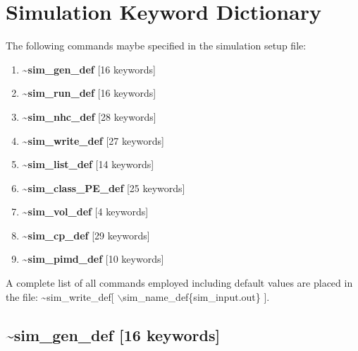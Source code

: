 \documentclass[12pt]{article}
\begin{document}
\newpage
\section*{\bf Simulation Keyword Dictionary} 

The following commands maybe specified in the simulation setup file:
\begin{enumerate}
\item {\bf \~{}sim\_gen\_def} [16 keywords]
\item {\bf \~{}sim\_run\_def} [16 keywords]
\item {\bf \~{}sim\_nhc\_def} [28 keywords]
\item {\bf \~{}sim\_write\_def} [27 keywords]
\item {\bf \~{}sim\_list\_def} [14 keywords]
\item {\bf \~{}sim\_class\_PE\_def} [25 keywords]
\item {\bf \~{}sim\_vol\_def} [4 keywords]
\item {\bf \~{}sim\_cp\_def} [29 keywords]
\item {\bf \~{}sim\_pimd\_def} [10 keywords]
\end{enumerate}
A complete list of all commands employed including default
values are placed in the file:
\~{}sim\_write\_def[ $\backslash$sim\_name\_def\{sim\_input.out\} ]. 


\newpage
\subsection*{\bf \~{}sim\_gen\_def [16 keywords]}
\end{document}
